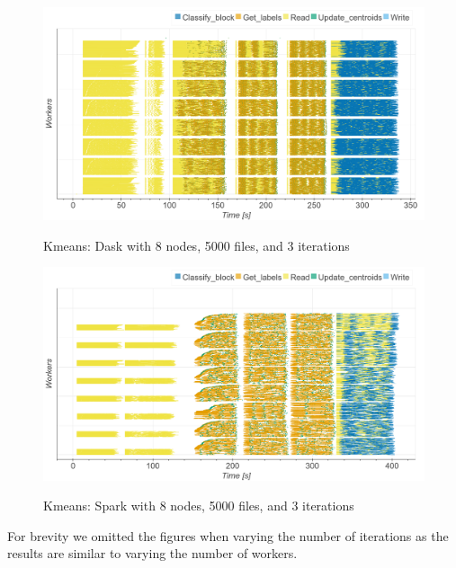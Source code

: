\documentclass[AMA,STIX1COL]{WileyNJD-v2}
\begin{document}
\begin{figure}[!h]
	\centering
	\href{https://mathdugre.me/paper-big-data-engines/ccpe/dask_kmeans_gantt.html}
	{\includegraphics[clip,width=\columnwidth]{figures/dask_kmeans_gantt.png}}
	\caption{Kmeans: Dask with 8 nodes, 5000 files, and 3 iterations}
	\label{fig:dask_kmeans_gantt}
\end{figure}
									
\begin{figure}[!h]
	\centering
	\href{https://mathdugre.me/paper-big-data-engines/ccpe/spark_kmeans_gantt.html}
	{\includegraphics[clip,width=\columnwidth]{figures/spark_kmeans_gantt.png}}
	\caption{Kmeans: Spark with 8 nodes, 5000 files, and 3 iterations}
	\label{fig:spark_kmeans_gantt}
\end{figure}
							
For brevity we omitted the figures when varying the number of iterations as the results are similar to varying the number of workers.
													
\end{document}
